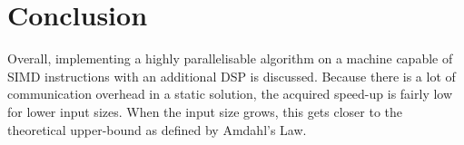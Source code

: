 \section{Conclusion}
Overall, implementing a highly parallelisable algorithm on a machine capable 
of SIMD instructions with an additional DSP is discussed. Because there is a 
lot of communication overhead in a static solution, the acquired speed-up is 
fairly low for lower input sizes. When the input size grows, this gets closer 
to the theoretical upper-bound as defined by Amdahl's Law. 
